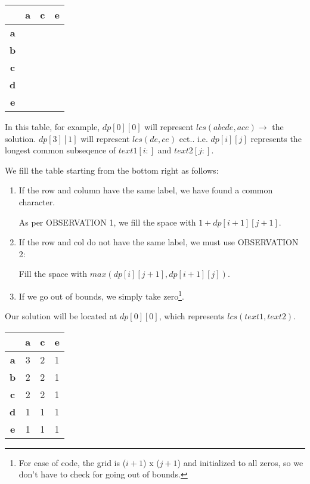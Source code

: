 \begin{table}[htbp]
    \centering
    \begin{tabular}{|c|c|c|c|}
        \hline
          & \textbf{a} & \textbf{c} & \textbf{e} \\
        \hline
        \textbf{a} &   &   &   \\
        \hline
        \textbf{b} &   &   &    \\
        \hline
        \textbf{c} &   &   &    \\
        \hline
        \textbf{d} &   &   &   \\
        \hline
        \textbf{e} &   &   &    \\
        \hline
    \end{tabular}
\end{table}

In this table, for example,
$dp[0][0]$ will represent $lcs(abcde,ace) \rightarrow$  the solution.
$dp[3][1]$ will represent $lcs(de,ce)$ ect..
i.e. $dp[i][j]$ represents the longest common subseqence of $text1[i:]$ and $text2[j:]$.

We fill the table starting from the bottom right as follows:

\begin{enumerate}
    \item If the row and column have the same label, we have found a common character.

    As per OBSERVATION 1, we fill the space with $1 + dp[i+1][j+1]$.
    
    \item If the row and col do not have the same label, we must use OBSERVATION 2:

    Fill the space with $max(dp[i][j+1], dp[i+1][j])$.
    
    \item If we go out of bounds, we simply take zero\footnote{For ease of code, the grid is ($i+1$) x ($j+1$) and initialized to all zeros, so we don't have to check for going out of bounds.}.
\end{enumerate}

Our solution will be located at $dp[0][0]$, which represents $lcs(text1,text2)$.

\begin{table}[htbp]
    \centering
    \begin{tabular}{|c|c|c|c|}
        \hline
          & \textbf{a} & \textbf{c} & \textbf{e} \\
        \hline
        \textbf{a} & 3 & 2 & 1 \\
        \hline
        \textbf{b} & 2 & 2 & 1  \\
        \hline
        \textbf{c} & 2 & 2 & 1  \\
        \hline
        \textbf{d} & 1 & 1 & 1 \\
        \hline
        \textbf{e} & 1 & 1 & 1  \\
        \hline
    \end{tabular}
\end{table}



